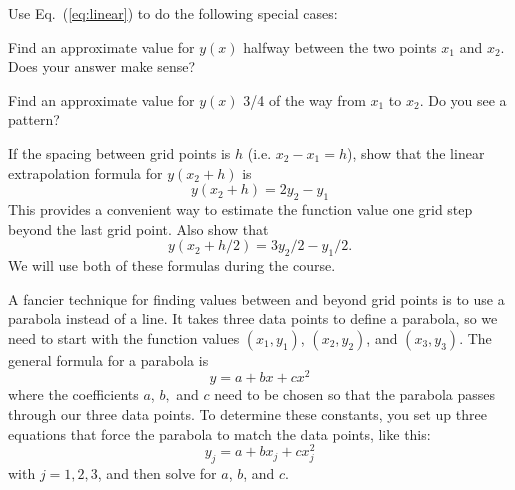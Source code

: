 \begin{enumerate}
\prob \label{P:1.3} Use Eq.~(\ref{eq:linear}) to do the following
    special cases:

\begin{enumerate}
\subprob Find an approximate value for $y(x)$ halfway between
    the two points $x_1$ and $x_2$. Does your answer make
    sense?

\subprob Find an approximate value for $y(x)$ 3/4 of the way
    from $x_1$ to $x_2$. Do you see a pattern?

\subprob If the spacing between grid points is $h$ (i.e.
    $x_2-x_1=h$), show that the linear extrapolation formula
    for $y(x_2+h)$ is
    \begin{equation}\label{eq:linExtrap}
        y(x_2+h) = 2 y_2 - y_1
    \end{equation}
    This provides a convenient way to estimate the function
    value one grid step beyond the last grid point.  Also
    show that
    \begin{equation}\label{eq:linExtraphalf}
        y(x_2+h/2) = 3 y_2 / 2 - y_1 / 2 .
    \end{equation}
    We will use both of these formulas during the course.
\end{enumerate}
\end{enumerate}


A fancier technique for finding values between and beyond grid points
is to use a parabola instead of a line. It takes three data points to
define a parabola, so we need to start with the function values
$(x_1,y_1)$, $(x_2,y_2)$, and $(x_3,y_3)$. The general formula for a
parabola is
\begin{equation}\label{eq:Parabola}
    y=a + bx + cx^2
\end{equation}
where the coefficients $a$, $b,$ and $c$ need to be chosen so that
the parabola passes through our three data points. To determine these
constants, you set up three equations that force the parabola to
match the data points, like this:
\begin{equation}\label{eq:ParabolaSet}
    y_j = a + bx_j + cx_j^2
\end{equation}
with $j=1,2,3$, and then solve for $a$, $b$, and $c$.

